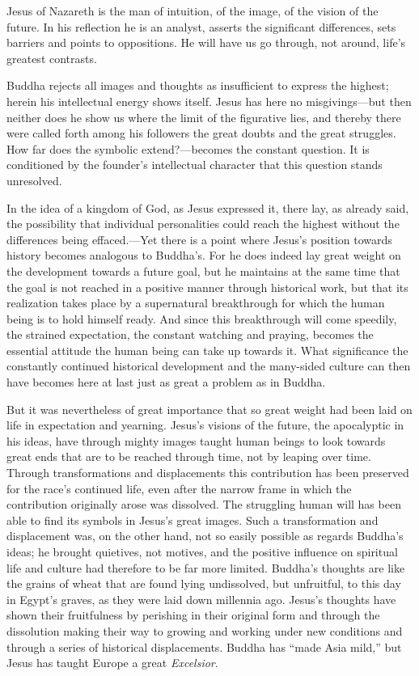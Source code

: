 \documentclass[12pt,a4paper]{book}
\newcommand{\opage}[1]{\marginnote{\footnotesize\textit{[#1]}}}
\begin{document}
Jesus of Nazareth is the man of intuition, of the image, of the vision of the future. In his reflection he
is an analyst, asserts the significant differences, sets barriers and points to oppositions. He 
\opage{200}will have
us go through, not around, life's greatest contrasts.

Buddha rejects all images and thoughts as insufficient to express the highest; herein his intellectual
energy shows itself. Jesus has here no misgivings---but then neither does he show us where the limit of the
figurative lies, and thereby there were called forth among his followers the great doubts and the great
struggles. How far does the symbolic extend?---becomes the constant question. It is conditioned by the
founder's intellectual character that this question stands unresolved.

In the idea of a kingdom of God, as Jesus expressed it, there lay, as already said, the possibility that
individual personalities could reach the highest without the differences being effaced.---Yet there is a
point where Jesus's position towards history becomes analogous to Buddha's. For he does indeed lay great
weight on the development towards a future goal, but he maintains at the same time that the goal is not
reached in a positive manner through historical work, but that its realization takes place by a supernatural
breakthrough for which the human being is to hold himself ready. And since this breakthrough will come
speedily, the strained expectation, the constant watching and praying, becomes the essential attitude the
human being can take up towards it. What significance the constantly continued historical development and
the many-sided culture can then have becomes here at last just as great a problem as in Buddha.

But it was nevertheless of great importance that so great weight had been laid on life in expectation and
yearning. Jesus's visions of the future, the apocalyptic in his ideas, have through mighty images taught
human beings to look towards great ends that are to be reached through time, not by leaping over time.
Through transformations and displacements this contribution has been preserved for the race's continued
life, even after the narrow frame in which the contribution originally arose was dissolved. The struggling
human will has been able to find its symbols in Jesus's great images. Such a transformation and displacement
was, on the other hand, not so easily possible as regards Buddha's ideas; he brought quietives, not motives,
and the positive influence on spiritual life and culture had therefore to be far more limited. Buddha's
thoughts are like the grains of wheat that are found lying undissolved, but unfruitful, to this day in
Egypt's graves, as they were laid down millennia ago. Jesus's thoughts have shown their fruitfulness by
perishing in their original form and through the dissolution making their 
\opage{201}way to growing and working under
new conditions and through a series of historical displacements. Buddha has ``made Asia mild,'' but Jesus
has taught Europe a great \textit{Excelsior}.
\end{document}
